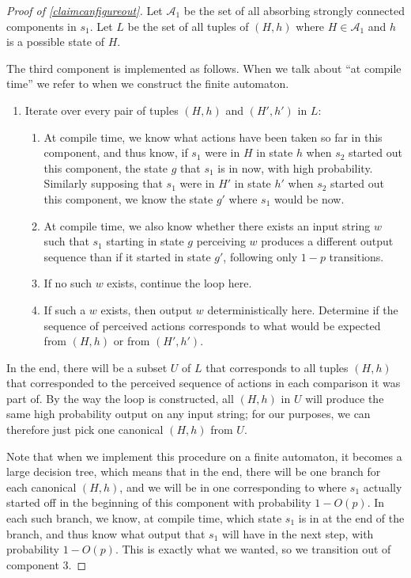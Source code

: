 \documentclass[12pt]{article}
\theoremstyle{definition}
\theoremstyle{remark}
\begin{document}
      \begin{proof}[Proof of \cref{claimcanfigureout}]
        
          Let $\mathcal{A}_1$ be the set of all absorbing strongly connected components in $s_1$.
           Let $L$ be the set of all tuples of $(H, h)$ where $H \in \mathcal{A}_1$ and $h$ is a possible state of $H$. 

        The third component is implemented as follows. When we talk about ``at compile time'' we refer to when we construct the finite automaton.
        \begin{enumerate}
          \item Iterate over every pair of tuples $(H,h)$ and $(H', h')$ in $L$:
          \begin{enumerate}
            \item At compile time, we know what actions have been taken so far in this component, and thus know, if $s_1$ were in $H$ in state $h$ when $s_2$ started out this component, the state $g$ that $s_1$ is in now, with high probability. Similarly supposing that $s_1$ were in $H'$ in state $h'$ when $s_2$ started out this component, we know the state $g'$ where $s_1$ would be now.
            \item At compile time, we also know whether there exists an input string $w$ such that $s_1$ starting in state $g$ perceiving $w$ produces a different output sequence than if it started in state $g'$, following only $1-p$ transitions.
            \item If no such $w$ exists, continue the loop here.
            \item If such a $w$ exists, then output $w$ deterministically here. Determine if the sequence of perceived actions corresponds to what would be expected from $(H,h)$ or from $(H', h')$.
          \end{enumerate}
        \end{enumerate}
        In the end, there will be a subset $U$ of $L$ that corresponds to all tuples $(H,h)$ that corresponded to the perceived sequence of actions in each comparison it was part of. By the way the loop is constructed, all $(H,h)$ in $U$ will produce the same high probability output on any input string; for our purposes, we can therefore just pick one canonical $(H,h)$ from $U$.

        Note that when we implement this procedure on a finite automaton, it becomes a large decision tree, which means that in the end, there will be one branch for each canonical $(H, h)$, and we will be in one corresponding to where $s_1$ actually started off in the beginning of this component with probability $1 - O(p)$. In each such branch, we know, at compile time, which state $s_1$ is in at the end of the branch, and thus know what output that $s_1$ will have in the next step, with probability $1 - O(p)$. This is exactly what we wanted, so we transition out of component 3.
      \end{proof}
\end{document}
